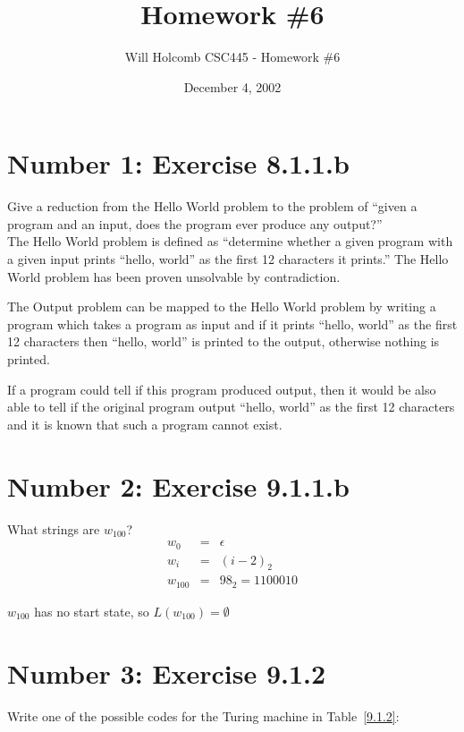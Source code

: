 \documentclass[12pt,a4paper,twoside]{article}  %
\author{Will Holcomb \small{CSC445 - Homework \#6}}
\title{Homework \#6}
\date{December 4, 2002}
\begin{document}
\maketitle

\section{Number 1: Exercise 8.1.1.b}

Give a reduction from the Hello World problem to the problem of
``given a program and an input, does the program ever produce any
output?''\\

The Hello World problem is defined as ``determine whether a given
program with a given input prints ``hello, world'' as the first 12
characters it prints.'' The Hello World problem has been proven
unsolvable by contradiction.

The Output problem can be mapped to the Hello World problem by writing
a program which takes a program as input and if it prints ``hello,
world'' as the first 12 characters then ``hello, world'' is printed to
the output, otherwise nothing is printed.

If a program could tell if this program produced output, then it
would be also able to tell if the original program output ``hello,
world'' as the first 12 characters and it is known that such a program
cannot exist.

\section{Number 2: Exercise 9.1.1.b}

What strings are $w_{100}$?\\

\begin{eqnarray}
w_{0}   &=& \epsilon        \nonumber\\
w_{i}   &=& (i - 2)_2       \nonumber\\
w_{100} &=& 98_2 = 1100010  \nonumber
\end{eqnarray}

$w_{100}$ has no start state, so $L(w_{100}) = \emptyset$

\section{Number 3: Exercise 9.1.2}

Write one of the possible codes for the Turing machine in
Table~\ref{9.1.2}:
\end{document}
